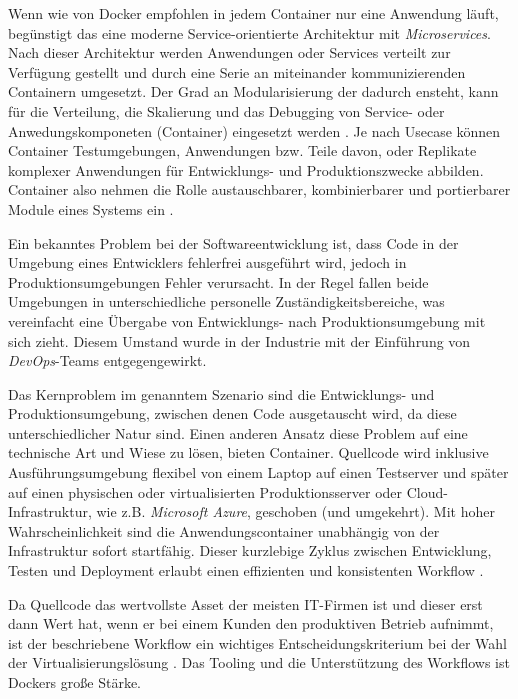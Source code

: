 \documentclass[../main.tex]{subfiles}
\begin{document}

    Wenn wie von Docker empfohlen in jedem Container nur eine Anwendung läuft, begünstigt das eine moderne Service-orientierte Architektur mit \emph{Microservices}. Nach dieser Architektur werden Anwendungen oder Services verteilt zur Verfügung gestellt und durch eine Serie an miteinander kommunizierenden Containern umgesetzt. Der Grad an Modularisierung der dadurch ensteht, kann für die Verteilung, die Skalierung und das Debugging von Service- oder Anwedungskomponeten (Container) eingesetzt werden \cite[S.9]{dockerBook}. Je nach Usecase können Container Testumgebungen, Anwendungen bzw. Teile davon, oder Replikate komplexer Anwendungen für Entwicklungs- und Produktionszwecke abbilden. Container also nehmen die Rolle austauschbarer, kombinierbarer und portierbarer Module eines Systems ein \cite[S.12]{dockerBook}.

    Ein bekanntes Problem bei der Softwareentwicklung ist, dass Code in der Umgebung eines Entwicklers fehlerfrei ausgeführt wird, jedoch in Produktionsumgebungen Fehler verursacht. In der Regel fallen beide Umgebungen in unterschiedliche personelle Zuständigkeitsbereiche, was vereinfacht eine Übergabe von Entwicklungs- nach Produktionsumgebung mit sich zieht. Diesem Umstand wurde in der Industrie mit der Einführung von \emph{\gls{DevOps}}-Teams entgegengewirkt.

    Das Kernproblem im genanntem Szenario sind die Entwicklungs- und Produktionsumgebung, zwischen denen Code ausgetauscht wird, da diese unterschiedlicher Natur sind. Einen anderen Ansatz diese Problem auf eine technische Art und Wiese zu lösen, bieten Container. Quellcode wird inklusive Ausführungsumgebung flexibel von einem Laptop auf einen Testserver und später auf einen physischen oder virtualisierten Produktionsserver oder \gls{Cloud}-Infrastruktur, wie z.B. \emph{Microsoft Azure}, geschoben (und umgekehrt). Mit hoher Wahrscheinlichkeit sind die Anwendungscontainer unabhängig von der Infrastruktur sofort startfähig. Dieser kurzlebige Zyklus zwischen Entwicklung, Testen und Deployment erlaubt einen effizienten und konsistenten Workflow \cite[S.8+12]{dockerBook}.

    Da Quellcode das wertvollste Asset der meisten \acrshort{IT}-Firmen ist und dieser erst dann Wert hat, wenn er bei einem Kunden den produktiven Betrieb aufnimmt, ist der beschriebene Workflow ein wichtiges Entscheidungskriterium bei der Wahl der Virtualisierungslösung \cite[S.1]{dockerIntroIEEE}. Das Tooling und die Unterstützung des Workflows ist Dockers große Stärke.
\end{document}
